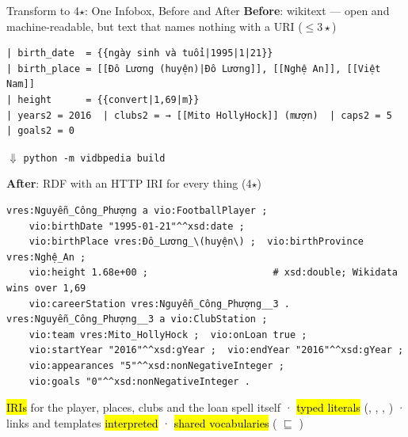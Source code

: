\begin{frame}[fragile]{Transform to 4$\star$: One Infobox, Before and After}
    \scriptsize
    \textbf{Before}: wikitext --- open and machine-readable, but text that names nothing with a URI ($\leq 3\star$)
\begin{Verbatim}[fontsize=\tiny]
| birth_date  = {{ngày sinh và tuổi|1995|1|21}}
| birth_place = [[Đô Lương (huyện)|Đô Lương]], [[Nghệ An]], [[Việt Nam]]
| height      = {{convert|1,69|m}}
| years2 = 2016  | clubs2 = → [[Mito HollyHock]] (mượn)  | caps2 = 5  | goals2 = 0
\end{Verbatim}
    \vspace{-0.3em}
    \begin{center}$\Downarrow$\; \texttt{python -m vidbpedia build}\end{center}
    \vspace{-0.6em}
    \textbf{After}: RDF with an HTTP IRI for every thing (4$\star$)
\begin{Verbatim}[fontsize=\tiny]
vres:Nguyễn_Công_Phượng a vio:FootballPlayer ;
    vio:birthDate "1995-01-21"^^xsd:date ;
    vio:birthPlace vres:Đô_Lương_\(huyện\) ;  vio:birthProvince vres:Nghệ_An ;
    vio:height 1.68e+00 ;                      # xsd:double; Wikidata wins over 1,69
    vio:careerStation vres:Nguyễn_Công_Phượng__3 .
vres:Nguyễn_Công_Phượng__3 a vio:ClubStation ;
    vio:team vres:Mito_HollyHock ;  vio:onLoan true ;
    vio:startYear "2016"^^xsd:gYear ;  vio:endYear "2016"^^xsd:gYear ;
    vio:appearances "5"^^xsd:nonNegativeInteger ;
    vio:goals "0"^^xsd:nonNegativeInteger .
\end{Verbatim}
    \hl{IRIs} for the player, places, clubs and the loan spell itself \;·\;
    \hl{typed literals} (, , , ) \;·\;
    links and templates \hl{interpreted} \;·\; \hl{shared vocabularies} ( $\sqsubseteq$ )
\end{frame}
